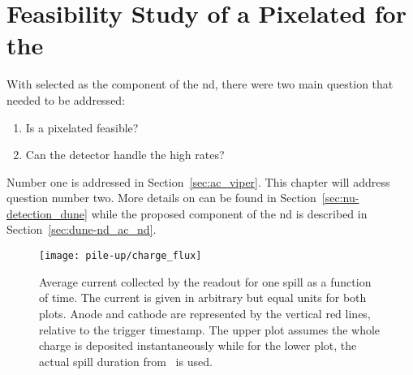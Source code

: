 \section{Feasibility Study of a Pixelated  for the  }
\label{sec:dune-nd_pile-up}

With \AC{} selected as  the \lar{} component of the \dune{} \gls{nd}, there were two main question that needed to be addressed:
\begin{enumerate}
	\item Is a pixelated \lartpc{} feasible?
	\item Can the \lar{} detector handle the high rates?
\end{enumerate}
Number one is addressed in Section~\ref{sec:ac_viper}.
This chapter will address question number two.
More details on \dune{} can be found in Section~\ref{sec:nu-detection_dune} while the proposed \AC{} \lar{} component of the \gls{nd} is described in Section~\ref{sec:dune-nd_ac_nd}.

\begin{figure}[htb]
	\centering
	\texttt{[image: pile-up/charge\_flux]}
	\caption{Average current collected by the readout for one spill as a function of time.
	The current is given in arbitrary but equal units for both plots.
	Anode and cathode are represented by the vertical red lines, relative to the trigger timestamp.
	The upper plot assumes the whole charge is deposited instantaneously while for the lower plot, the actual spill duration from~\cite{dune2} is used.}
	\label{fig:dune-nd_charge-flux}
\end{figure}

